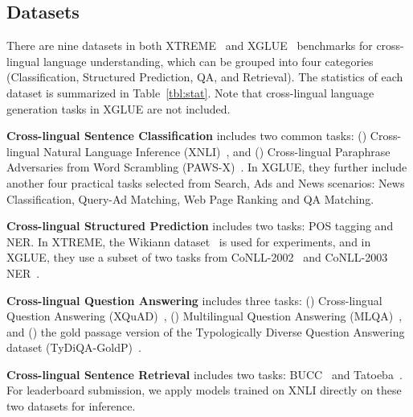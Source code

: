 \subsection{Datasets}
There are nine datasets in both XTREME~\cite{hu2020xtreme} and XGLUE~\cite{liang2020xglue} benchmarks for cross-lingual language understanding, which can be grouped into four categories (Classification, Structured Prediction, QA, and Retrieval). The statistics of each dataset is summarized in Table~\ref{tbl:stat}. Note that cross-lingual language generation tasks in XGLUE are not included. 

\noindent\textbf{Cross-lingual Sentence Classification} includes two common tasks: () Cross-lingual Natural Language Inference (XNLI)~\cite{conneau2018xnli}, and () Cross-lingual Paraphrase Adversaries from Word Scrambling (PAWS-X)~\cite{yang2019paws}. 
In XGLUE, they further include another four practical tasks selected from Search, Ads and News scenarios: News Classification, Query-Ad Matching, Web Page Ranking and QA Matching.


\noindent\textbf{Cross-lingual Structured Prediction} includes two tasks: POS tagging and NER. 
In XTREME, the Wikiann dataset~\cite{pan2017cross} is used for experiments, and in XGLUE, they use a subset of two tasks from CoNLL-2002~\cite{tjong-kim-sang-2002-introduction} and CoNLL-2003 NER~\cite{tjong-kim-sang-de-meulder-2003-introduction}.

\noindent\textbf{Cross-lingual Question Answering} includes three tasks: () Cross-lingual Question Answering (XQuAD)~\cite{Artetxe:etal:2019}, () Multilingual Question Answering (MLQA)~\cite{lewis2019mlqa}, and () the gold passage version of the Typologically Diverse Question Answering dataset (TyDiQA-GoldP)~\cite{clark2020tydi}.


\noindent\textbf{Cross-lingual Sentence Retrieval} includes two tasks: BUCC~\cite{zweigenbaum2018overview} and Tatoeba~\cite{artetxe2019massively}. For leaderboard submission, we apply models trained on XNLI directly on these two datasets for inference.

